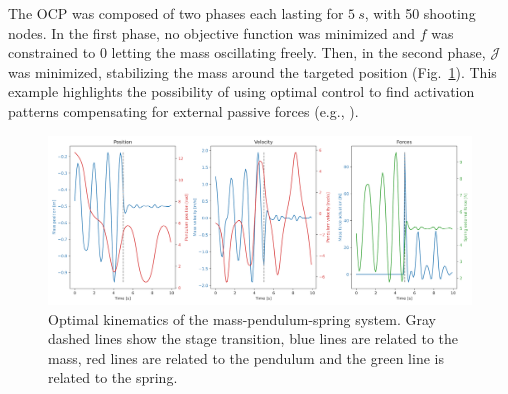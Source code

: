 The OCP was composed of two phases each lasting for $\SI{5}{s}$, with 50 shooting nodes.
In the first phase, no objective function was minimized and $f$ was constrained to $0$ letting the mass oscillating freely. 
Then, in the second phase, $\mathcal{J}$ was minimized, stabilizing the mass around the targeted position (Fig.~\ref{fig:Mass_Pendulum_Fext_graphs}).
This example highlights the possibility of using optimal control to find activation patterns compensating for external passive forces (e.g., ).

\begin{figure}[t!]
\centering
\includegraphics[width=\textwidth]{figures/Mass_Pendulum_Fext.png}
\caption{Optimal kinematics of the mass-pendulum-spring system. Gray dashed lines show the stage transition, blue lines are related to the mass, red lines are related to the pendulum and the green line is related to the spring.}
\label{fig:Mass_Pendulum_Fext_graphs}
\end{figure}














